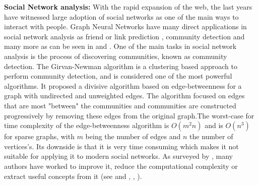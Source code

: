 \textbf{Social Network analysis:} With the rapid expansion of the web, the last years have witnessed large adoption of social networks as one of the main ways to interact with people. Graph Neural Networks have many direct applications in social network analysis as friend or link prediction \cite{liben2007link}, community detection \cite{gcn} and many more as can be seen in \cite{hamilton} and \cite{fey2019fast}. One of the main tasks in social network analysis is the process of discovering communities, known as community detection. The Girvan-Newman algorithm \cite{girvan2002community} is a clustering based approach to perform community detection, and is considered one of the most powerful algorithms. It proposed a divisive algorithm based on edge-betweenness for a graph with undirected and unweighted edges. The algorithm focused on edges that are most "between" the communities and communities are constructed progressively by removing these edges from the original graph.The worst-case for time complexity of the edge-betweenness algorithm is $O(m^2n)$ and is $O(n^3)$ for sparse graphs, with $m$ being the number of edges and $n$ the number of vertices's. Its downside is that it is very time consuming which makes it not suitable for applying it to modern social networks. As surveyed by \cite{Bedi}, many authors have worked to improve it, reduce the computational complexity or extract useful concepts from it (see \cite{Radicchi} and \cite{Rattigan}, \cite{Chen}, \cite{Newman2} ). 







